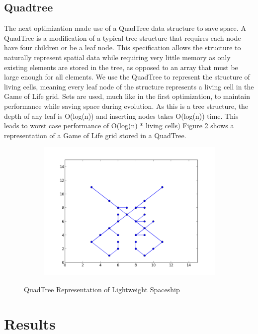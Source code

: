 \documentclass[11pt]{article}
\begin{document}
\subsection*{Quadtree}
The next optimization made use of a QuadTree data structure to save space.  A QuadTree is a modification of a typical tree structure that requires each node have four children or be a leaf node.  This specification allows the structure to naturally represent spatial data while requiring very little memory as only existing elements are stored in the tree, as opposed to an array that must be large enough for all elements.  We use the QuadTree to represent the structure of living cells, meaning every leaf node of the structure represents a living cell in the Game of Life grid.  Sets are used, much like in the first optimization, to maintain performance while saving space during evolution.  As this is a tree structure, the depth of any leaf is O(log(n)) and inserting nodes takes O(log(n)) time.  This leads to worst case performance of O(log(n) * living cells)   Figure \ref{fig:quadtree_lws} shows a representation of a Game of Life grid stored in a QuadTree.
\begin{figure}[!ht]
	\centering
	\begin{subfigure}{\textwidth}
		\centering
  	  	\includegraphics[width=1\linewidth]{images/quadtree_lws.png}
  	  	\label{fig:quad_lws}
	\end{subfigure}
	\caption{QuadTree Representation of Lightweight Spaceship}
	\label{fig:quadtree_lws}
\end{figure}
\section{Results}
\end{document}
